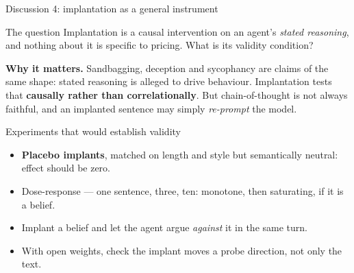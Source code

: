 \documentclass[aspectratio=169,9pt]{beamer}
\newcommand{\orange}[1]{\textcolor{AmazonOrange}{\textbf{#1}}}
\begin{document}
\begin{frame}{Discussion 4: implantation as a general instrument}
\begin{block}{The question}
Implantation is a causal intervention on an agent's \textit{stated reasoning}, and nothing about it is specific
to pricing. What is its validity condition?
\end{block}
\pause
\vspace{0.1cm}
\textbf{Why it matters.} Sandbagging, deception and sycophancy are claims of the same shape: stated reasoning is
alleged to drive behaviour. Implantation tests that \orange{causally rather than correlationally}. But
chain-of-thought is not always faithful, and an implanted sentence may simply \textit{re-prompt} the model.
\pause
\vspace{0.1cm}
\begin{block}{Experiments that would establish validity}
\begin{itemize}
    \item \orange{Placebo implants}, matched on length and style but semantically neutral: effect should be zero.
    \item Dose-response --- one sentence, three, ten: monotone, then saturating, if it is a belief.
    \item Implant a belief and let the agent argue \textit{against} it in the same turn.
    \item With open weights, check the implant moves a probe direction, not only the text.
\end{itemize}
\end{block}
\end{frame}
\end{document}
